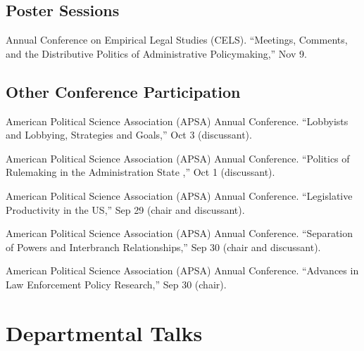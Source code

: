 \documentclass[12pt,letterpaper]{report}
\newcommand{\talk}[4]{\item[#1]{\tab{}#3. \enquote{#2,} #4.}} %
\newcommand{\APSA}{American Political Science Association (APSA) Annual Conference}
\begin{document}
    \subsection*{Poster Sessions}
    \begin{tablist}
    \talk{2018}{Meetings, Comments, and the Distributive Politics of Administrative Policymaking}{Annual Conference on Empirical Legal Studies (CELS)}{Nov 9}
    \end{tablist}

    \subsection*{Other Conference Participation}
    \begin{tablist}
    \talk{2021}{Lobbyists and Lobbying, Strategies and Goals}{\APSA}{Oct 3 (discussant)}    
    \talk{2021}{Politics of Rulemaking in the Administration State  }{\APSA}{Oct 1 (discussant)}    
    \talk{2021}{Legislative Productivity in the US}{\APSA}{Sep 29 (chair and discussant)}
    \talk{2021}{Separation of Powers and Interbranch Relationships}{\APSA}{Sep 30 (chair and discussant)}
    \talk{2021}{Advances in Law Enforcement Policy Research}{\APSA}{Sep 30 (chair)}
    \end{tablist}


    \section*{Departmental Talks}
\end{document}
